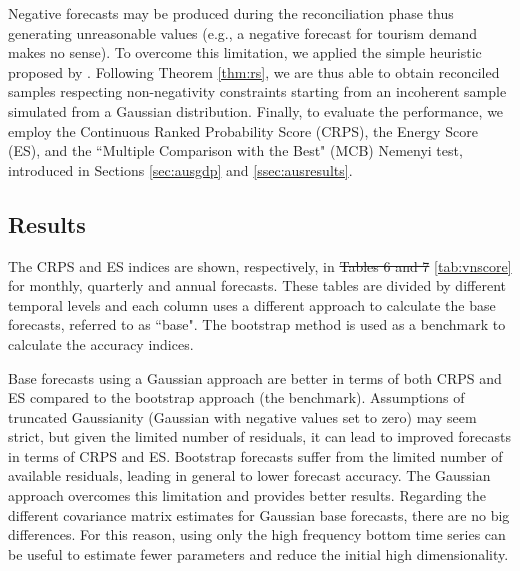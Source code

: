 \documentclass[review, 11pt]{elsarticle}
\theoremstyle{definition}
\begin{document}
Negative forecasts may be produced during the reconciliation phase \citep{wickramasuriya2020, difonzo2022a, difonzo2023a} thus generating unreasonable values (e.g., a negative forecast for tourism demand makes no sense). To overcome this limitation, we applied the simple heuristic proposed by \cite{difonzo2022b, difonzo2023a}. Following Theorem \ref{thm:rs}, we are thus able to obtain reconciled samples respecting non-negativity constraints starting from an incoherent sample simulated from a Gaussian distribution. Finally, to evaluate the performance, we employ the Continuous Ranked Probability Score (CRPS), the Energy Score (ES), and the “Multiple Comparison with the Best" (MCB) Nemenyi test, introduced in Sections \ref{sec:ausgdp} and \ref{ssec:ausresults}.

\subsection{Results}


\begin{table}[!tb]
	\centering
	\begingroup
	\fontsize{9}{10}\selectfont
	
	\endgroup
	\caption{\color{blue}$\overline{RelCRPS}$ and ES ratio indices defined in \eqref{eq:skill} and \eqref{eq:skill_all} for the Australian Tourism Demand dataset. %
	Approaches performing worse than the benchmark (bootstrap base forecasts, ctjb) are highlighted in red, the best for each column is marked in bold, and the overall lowest value is highlighted in blue. The reconciliation approaches are described in \autoref{tab:notation}.}
	\label{tab:vnscore}
	\vspace*{-0.5\baselineskip}
\end{table}

The CRPS and ES indices are shown, respectively, in {\color{red}\sout{Tables 6 and 7}} {\color{blue}\autoref{tab:vnscore}} for monthly, quarterly and annual forecasts. These tables are divided by different temporal levels and each column uses a different approach to calculate the base forecasts, referred to as “base". The bootstrap method is used as a benchmark to calculate the accuracy indices.


Base forecasts using a Gaussian approach are better in terms of both CRPS and ES compared to the bootstrap approach (the benchmark). Assumptions of truncated Gaussianity (Gaussian with negative values set to zero) may seem strict, but given the limited number of residuals, it can lead to improved forecasts in terms of CRPS and ES. Bootstrap forecasts suffer from the limited number of available residuals, leading in general to lower forecast accuracy. The Gaussian approach overcomes this limitation and provides better results. Regarding the different covariance matrix estimates for Gaussian base forecasts, there are no big differences. For this reason, using only the high frequency bottom time series can be useful to estimate fewer parameters and reduce the initial high dimensionality.
\end{document}
